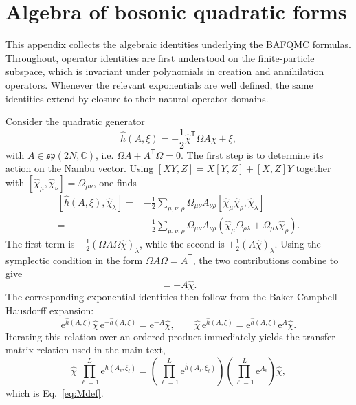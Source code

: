 \documentclass[twocolumn,aps,prb,10pt,amsmath,amssymb,amsthm,superscriptaddress]{revtex4-2}
\newcommand{\ee}{\mathrm{e}}
\newcommand{\trans}{\mathsf{T}}
\theoremstyle{remark}
\begin{document}
\appendix

\section{Algebra of bosonic quadratic forms}
\label{app:algebra}

This appendix collects the algebraic identities underlying the BAFQMC formulas. Throughout, operator identities are first understood on the finite-particle subspace, which is invariant under polynomials in creation and annihilation operators. Whenever the relevant exponentials are well defined, the same identities extend by closure to their natural operator domains.

Consider the quadratic generator
\begin{equation}
    \hat h(A,\xi) = -\frac12\hat\chi^\trans\Omega A\hat\chi + \xi,
\end{equation}
with $A\in\mathfrak{sp}(2N,\mathbb C)$, i.e. $\Omega A+A^\trans\Omega=0$. The first step is to determine its action on the Nambu vector. Using $[XY,Z]=X[Y,Z]+[X,Z]Y$ together with $[\hat\chi_\mu,\hat\chi_\nu]=\Omega_{\mu\nu}$, one finds
\begin{equation}
\begin{aligned}
    [\hat h(A,\xi),\hat\chi_\lambda]
    ={}& -\frac12\sum_{\mu,\nu,\rho}
    \Omega_{\mu\nu}A_{\nu\rho}
    [\hat\chi_\mu\hat\chi_\rho,\hat\chi_\lambda] \\
    ={}& -\frac12\sum_{\mu,\nu,\rho}
    \Omega_{\mu\nu}A_{\nu\rho}
    \left(\hat\chi_\mu\Omega_{\rho\lambda}+\Omega_{\mu\lambda}\hat\chi_\rho\right).
\end{aligned}
\end{equation}
The first term is $-\frac12(\Omega A\Omega\hat\chi)_\lambda$, while the second is $+\frac12(A\hat\chi)_\lambda$. Using the symplectic condition in the form $\Omega A\Omega=A^\trans$, the two contributions combine to give
\begin{equation}
    [\hat h(A,\xi),\hat\chi] = -A\hat\chi.
    \label{eq:appendix_commutator}
\end{equation}
The corresponding exponential identities then follow from the Baker-Campbell-Hausdorff expansion:
\begin{equation}
    \ee^{\hat h(A,\xi)}\hat\chi\,\ee^{-\hat h(A,\xi)} = \ee^{-A}\hat\chi,
    \qquad
    \hat\chi\,\ee^{\hat h(A,\xi)} = \ee^{\hat h(A,\xi)}\ee^{A}\hat\chi.
\end{equation}
Iterating this relation over an ordered product immediately yields the transfer-matrix relation used in the main text,
\begin{equation}
    \hat\chi\,\prod_{\ell=1}^{L}\ee^{\hat h(A_\ell,\xi_\ell)}
    = \left(\prod_{\ell=1}^{L}\ee^{\hat h(A_\ell,\xi_\ell)}\right)
      \left(\prod_{\ell=1}^{L}\ee^{A_\ell}\right)\hat\chi,
\end{equation}
which is Eq.~\eqref{eq:Mdef}.
\end{document}
